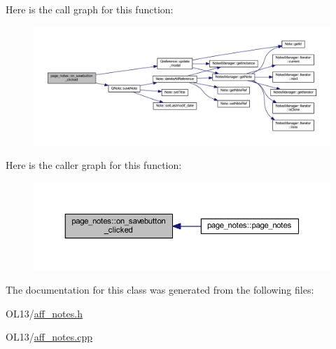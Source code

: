 Here is the call graph for this function\+:\nopagebreak
\begin{figure}[H]
\begin{center}
\leavevmode
\includegraphics[width=350pt]{classpage__notes_a3810696feb56abdad663cb7ae4b2f1b0_cgraph}
\end{center}
\end{figure}
Here is the caller graph for this function\+:\nopagebreak
\begin{figure}[H]
\begin{center}
\leavevmode
\includegraphics[width=350pt]{classpage__notes_a3810696feb56abdad663cb7ae4b2f1b0_icgraph}
\end{center}
\end{figure}


The documentation for this class was generated from the following files\+:\begin{DoxyCompactItemize}
\item 
O\+L13/\hyperlink{aff__notes_8h}{aff\+\_\+notes.\+h}\item 
O\+L13/\hyperlink{aff__notes_8cpp}{aff\+\_\+notes.\+cpp}\end{DoxyCompactItemize}
